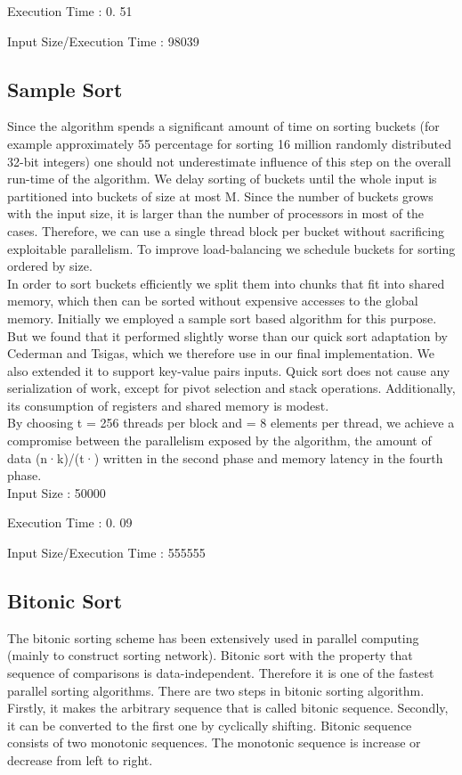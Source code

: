 \documentclass[conference]{IEEEtran}
\begin{document}
Execution Time : 0. 51

Input Size/Execution Time : 98039\\

\subsection{Sample Sort}
Since the algorithm spends a significant
amount of time on sorting buckets (for example approximately
55 percentage for sorting 16 million randomly distributed
32-bit integers) one should not underestimate influence of
this step on the overall run-time of the algorithm. We delay
sorting of buckets until the whole input is partitioned into
buckets of size at most M. Since the number of buckets
grows with the input size, it is larger than the number of
processors in most of the cases. Therefore, we can use a
single thread block per bucket without sacrificing exploitable
parallelism. To improve load-balancing we schedule buckets
for sorting ordered by size.\\

In order to sort buckets efficiently we split them into
chunks that fit into shared memory, which then can be
sorted without expensive accesses to the global memory.
Initially we employed a sample sort based algorithm for
this purpose. But we found that it performed slightly worse
than our quick sort adaptation by Cederman and Tsigas,
which we therefore use in our final implementation. We
also extended it to support key-value pairs inputs. Quick sort
does not cause any serialization of work, except for pivot
selection and stack operations. Additionally, its consumption
of registers and shared memory is modest. \\

 By choosing t = 256 threads per block and = 8
elements per thread, we achieve a compromise between the
parallelism exposed by the algorithm, the amount of data
(n·k)/(t·) written in the second phase and memory latency
in the fourth phase.\\

Input Size : 50000

Execution Time : 0. 09

Input Size/Execution Time : 555555

\subsection{Bitonic Sort}
The bitonic sorting scheme has been extensively used in
parallel computing (mainly to construct sorting network).
Bitonic sort with the property that sequence of comparisons is
data-independent. Therefore it is one of the fastest parallel
sorting algorithms. There are two steps in bitonic sorting
algorithm. Firstly, it makes the arbitrary sequence that is
called bitonic sequence. Secondly, it can be converted to the
first one by cyclically shifting. Bitonic sequence consists
of two monotonic sequences. The monotonic sequence is
increase or decrease from left to right.\\
\end{document}
